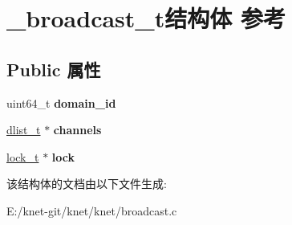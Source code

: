 \hypertarget{struct__broadcast__t}{}\section{\+\_\+broadcast\+\_\+t结构体 参考}
\label{struct__broadcast__t}
\subsection*{Public 属性}
\begin{DoxyCompactItemize}
\item 
\hypertarget{struct__broadcast__t_a887426648129995bc262be3e38374701}{}uint64\+\_\+t {\bfseries domain\+\_\+id}\label{struct__broadcast__t_a887426648129995bc262be3e38374701}

\item 
\hypertarget{struct__broadcast__t_a0383fe415a6ee3a6bdf0c3a7b4b32ba0}{}\hyperlink{struct__dlist__t}{dlist\+\_\+t} $\ast$ {\bfseries channels}\label{struct__broadcast__t_a0383fe415a6ee3a6bdf0c3a7b4b32ba0}

\item 
\hypertarget{struct__broadcast__t_a2bc571705fea7b02c4aef0c67f826759}{}\hyperlink{struct__lock__t}{lock\+\_\+t} $\ast$ {\bfseries lock}\label{struct__broadcast__t_a2bc571705fea7b02c4aef0c67f826759}

\end{DoxyCompactItemize}


该结构体的文档由以下文件生成\+:\begin{DoxyCompactItemize}
\item 
E\+:/knet-\/git/knet/knet/broadcast.\+c\end{DoxyCompactItemize}
